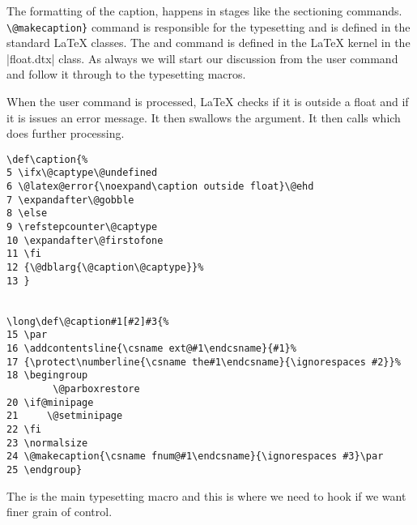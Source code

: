 The formatting of the caption, happens in stages like the sectioning commands.  \lstinline+\@makecaption}+  command is responsible for the typesetting and is defined in the standard LaTeX classes. The  and command is defined in the LaTeX kernel in the 
|float.dtx| class. As always we will start our discussion from the user command and follow it through to the typesetting macros.

When the user command  is processed, LaTeX checks if it is outside a float and if it is issues an error message. It then swallows the argument. It then calls  which does further processing.


\begin{tcolorbox}
\begin{lstlisting}
\def\caption{%
5 \ifx\@captype\@undefined
6 \@latex@error{\noexpand\caption outside float}\@ehd
7 \expandafter\@gobble
8 \else
9 \refstepcounter\@captype
10 \expandafter\@firstofone
11 \fi
12 {\@dblarg{\@caption\@captype}}%
13 }


\long\def\@caption#1[#2]#3{%
15 \par
16 \addcontentsline{\csname ext@#1\endcsname}{#1}%
17 {\protect\numberline{\csname the#1\endcsname}{\ignorespaces #2}}%
18 \begingroup
        \@parboxrestore
20 \if@minipage
21     \@setminipage
22 \fi
23 \normalsize
24 \@makecaption{\csname fnum@#1\endcsname}{\ignorespaces #3}\par
25 \endgroup}
\end{lstlisting}
\end{tcolorbox}

The  is the main typesetting macro and this is
where we need to hook if we want finer grain of control.




\begin{texexample}{}{}



\end{texexample}


